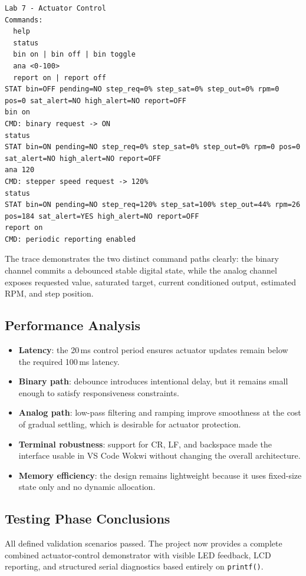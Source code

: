 \documentclass[12pt]{article}
\begin{document}
\begin{verbatim}
Lab 7 - Actuator Control
Commands:
  help
  status
  bin on | bin off | bin toggle
  ana <0-100>
  report on | report off
STAT bin=OFF pending=NO step_req=0% step_sat=0% step_out=0% rpm=0 pos=0 sat_alert=NO high_alert=NO report=OFF
bin on
CMD: binary request -> ON
status
STAT bin=ON pending=NO step_req=0% step_sat=0% step_out=0% rpm=0 pos=0 sat_alert=NO high_alert=NO report=OFF
ana 120
CMD: stepper speed request -> 120%
status
STAT bin=ON pending=NO step_req=120% step_sat=100% step_out=44% rpm=26 pos=184 sat_alert=YES high_alert=NO report=OFF
report on
CMD: periodic reporting enabled
\end{verbatim}

The trace demonstrates the two distinct command paths clearly: the binary channel commits a debounced stable digital state, while the analog channel exposes requested value, saturated target, current conditioned output, estimated RPM, and step position.

\subsection{Performance Analysis}

\begin{itemize}
    \item \textbf{Latency}: the 20\,ms control period ensures actuator updates remain below the required 100\,ms latency.
    \item \textbf{Binary path}: debounce introduces intentional delay, but it remains small enough to satisfy responsiveness constraints.
    \item \textbf{Analog path}: low-pass filtering and ramping improve smoothness at the cost of gradual settling, which is desirable for actuator protection.
    \item \textbf{Terminal robustness}: support for CR, LF, and backspace made the interface usable in VS Code Wokwi without changing the overall architecture.
    \item \textbf{Memory efficiency}: the design remains lightweight because it uses fixed-size state only and no dynamic allocation.
\end{itemize}

\subsection{Testing Phase Conclusions}
\hspace{0.8cm} All defined validation scenarios passed. The project now provides a complete combined actuator-control demonstrator with visible LED feedback, LCD reporting, and structured serial diagnostics based entirely on \texttt{printf()}.
\end{document}
